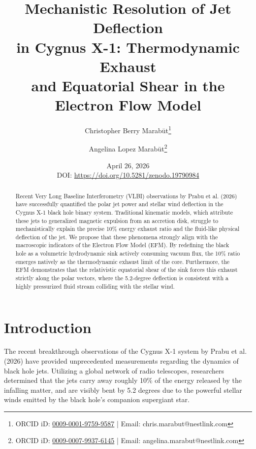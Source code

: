 \documentclass[11pt, a4paper]{article}
\title{\textbf{Mechanistic Resolution of Jet Deflection \\ in Cygnus X-1: Thermodynamic Exhaust \\ and Equatorial Shear in the Electron Flow Model}}
\author[1]{Christopher Berry Marab\={u}t\thanks{ORCID iD: \href{https://orcid.org/0009-0001-9759-9587}{0009-0001-9759-9587} | Email: chris.marabut@nestlink.com}}
\author[1]{Angelina Lopez Marab\={u}t\thanks{ORCID iD: \href{https://orcid.org/0009-0007-9937-6145}{0009-0007-9937-6145} | Email: angelina.marabut@nestlink.com}}
\affil[1]{Independent Researchers}
\date{April 26, 2026 \\ \small{DOI: \url{https://doi.org/10.5281/zenodo.19790984}}}
\begin{document}

\maketitle

\begin{abstract}
Recent Very Long Baseline Interferometry (VLBI) observations by Prabu et al. (2026) have successfully quantified the polar jet power and stellar wind deflection in the Cygnus X-1 black hole binary system. Traditional kinematic models, which attribute these jets to generalized magnetic expulsion from an accretion disk, struggle to mechanistically explain the precise 10\% energy exhaust ratio and the fluid-like physical deflection of the jet. We propose that these phenomena strongly align with the macroscopic indicators of the Electron Flow Model (EFM). By redefining the black hole as a volumetric hydrodynamic sink actively consuming vacuum flux, the 10\% ratio emerges natively as the thermodynamic exhaust limit of the core. Furthermore, the EFM demonstrates that the relativistic equatorial shear of the sink forces this exhaust strictly along the polar vectors, where the 5.2-degree deflection is consistent with a highly pressurized fluid stream colliding with the stellar wind.
\end{abstract}

\section{Introduction}
The recent breakthrough observations of the Cygnus X-1 system by Prabu et al. (2026) \cite{prabu2026} have provided unprecedented measurements regarding the dynamics of black hole jets. Utilizing a global network of radio telescopes, researchers determined that the jets carry away roughly 10\% of the energy released by the infalling matter, and are visibly bent by 5.2 degrees due to the powerful stellar winds emitted by the black hole's companion supergiant star.
\end{document}
